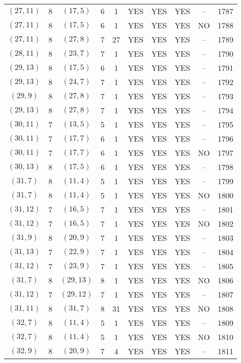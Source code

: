 \begin{longtable}{|c|c|c|c|c|c|c|c|c|c|}
$(27, 11)$ & 8 & $(17, 5)$ & 6 & 1 & YES & YES & YES & -- & 1787\\
$(27, 11)$ & 8 & $(17, 5)$ & 6 & 1 & YES & YES & YES & NO & 1788\\
$(27, 11)$ & 8 & $(27, 8)$ & 7 & 27 & YES & YES & YES & -- & 1789\\
$(28, 11)$ & 8 & $(23, 7)$ & 7 & 1 & YES & YES & YES & -- & 1790\\
$(29, 13)$ & 8 & $(17, 5)$ & 6 & 1 & YES & YES & YES & -- & 1791\\
$(29, 13)$ & 8 & $(24, 7)$ & 7 & 1 & YES & YES & YES & -- & 1792\\
$(29, 9)$ & 8 & $(27, 8)$ & 7 & 1 & YES & YES & YES & -- & 1793\\
$(29, 13)$ & 8 & $(27, 8)$ & 7 & 1 & YES & YES & YES & -- & 1794\\
$(30, 11)$ & 7 & $(13, 5)$ & 5 & 1 & YES & YES & YES & -- & 1795\\
$(30, 11)$ & 7 & $(17, 7)$ & 6 & 1 & YES & YES & YES & -- & 1796\\
$(30, 11)$ & 7 & $(17, 7)$ & 6 & 1 & YES & YES & YES & NO & 1797\\
$(30, 13)$ & 8 & $(17, 5)$ & 6 & 1 & YES & YES & YES & -- & 1798\\
$(31, 7)$ & 8 & $(11, 4)$ & 5 & 1 & YES & YES & YES & -- & 1799\\
$(31, 7)$ & 8 & $(11, 4)$ & 5 & 1 & YES & YES & YES & NO & 1800\\
$(31, 12)$ & 7 & $(16, 5)$ & 7 & 1 & YES & YES & YES & -- & 1801\\
$(31, 12)$ & 7 & $(16, 5)$ & 7 & 1 & YES & YES & YES & NO & 1802\\
$(31, 9)$ & 8 & $(20, 9)$ & 7 & 1 & YES & YES & YES & -- & 1803\\
$(31, 13)$ & 7 & $(22, 9)$ & 7 & 1 & YES & YES & YES & -- & 1804\\
$(31, 12)$ & 7 & $(23, 9)$ & 7 & 1 & YES & YES & YES & -- & 1805\\
$(31, 7)$ & 8 & $(29, 13)$ & 8 & 1 & YES & YES & YES & NO & 1806\\
$(31, 12)$ & 7 & $(29, 12)$ & 7 & 1 & YES & YES & YES & -- & 1807\\
$(31, 11)$ & 8 & $(31, 7)$ & 8 & 31 & YES & YES & YES & NO & 1808\\
$(32, 7)$ & 8 & $(11, 4)$ & 5 & 1 & YES & YES & YES & -- & 1809\\
$(32, 7)$ & 8 & $(11, 4)$ & 5 & 1 & YES & YES & YES & NO & 1810\\
$(32, 9)$ & 8 & $(20, 9)$ & 7 & 4 & YES & YES & YES & -- & 1811\\

\end{longtable}
